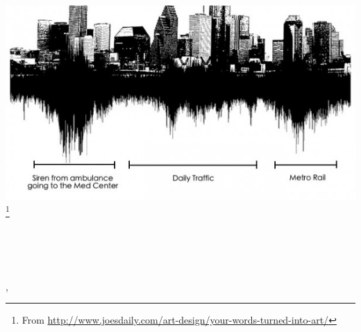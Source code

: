 \begin{titlepage}
    \begin{addmargin}[-1cm]{-3cm}
    \begin{center}
        \large  

        \hfill

        \vfill

        \begingroup
            \color{Maroon}\spacedallcaps{\myTitle} \\ \bigskip
        \endgroup
		\medskip 
		\mySubtitle \\ \bigskip

		\vfill
		
        \includegraphics[scale=.5]{gfx/citySound.jpg}\footnote{From \url{http://www.joesdaily.com/art-design/your-words-turned-into-art/}} \\ \medskip
		
		\vfill
		
        \spacedlowsmallcaps{\myName}

        \vfill
        
        \myDegree \\ \bigskip
        
        \myDepartment \\                            
        \myFaculty \\
        \myUni , \myLocation\\ \bigskip
		
		\vfill 
		
        \myTime 

        \vfill                      

    \end{center}  
  \end{addmargin}       
\end{titlepage}   